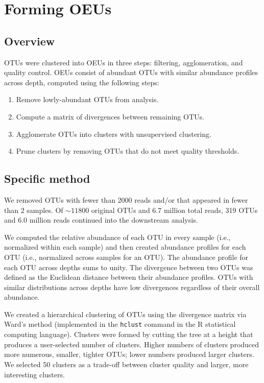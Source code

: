 \documentclass{report}
\begin{document}
\chapter{Forming OEUs}
\section{Overview}
OTUs were clustered into OEUs in three steps: filtering, agglomeration, and quality control. OEUs consist of abundant OTUs with similar abundance profiles across depth, computed using the following steps:

\begin{enumerate}
\item Remove lowly-abundant OTUs from analysis.
\item Compute a matrix of divergences between remaining OTUs. 
\item Agglomerate OTUs into clusters with unsupervised clustering.
\item Prune clusters by removing OTUs that do not meet quality thresholds.
\end{enumerate}

\section{Specific method}
We removed OTUs with fewer than 2000 reads and/or that appeared in fewer than 2 samples. Of $\mathord{\sim} 11800$ original OTUs and 6.7 million total reads, 319 OTUs and 6.0 million reads continued into the downstream analysis.

We computed the relative abundance of each OTU in every sample (i.e., normalized within each sample) and then created abundance profiles for each OTU (i.e., normalized across samples for an OTU). The abundance profile for each OTU across depths sums to unity. The divergence between two OTUs was defined as the Euclidean distance between their abundance profiles. OTUs with similar distributions across depths have low divergences regardless of their overall abundance.

We created a hierarchical clustering of OTUs using the divergence matrix via Ward's method (implemented in the {\tt hclust} command in the R statistical computing language). Clusters were formed by cutting the tree at a height that produces a user-selected number of clusters. Higher numbers of clusters produced more numerous, smaller, tighter OTUs; lower numbers produced larger clusters. We selected 50 clusters as a trade-off between cluster quality and larger, more interesting clusters.
\end{document}

